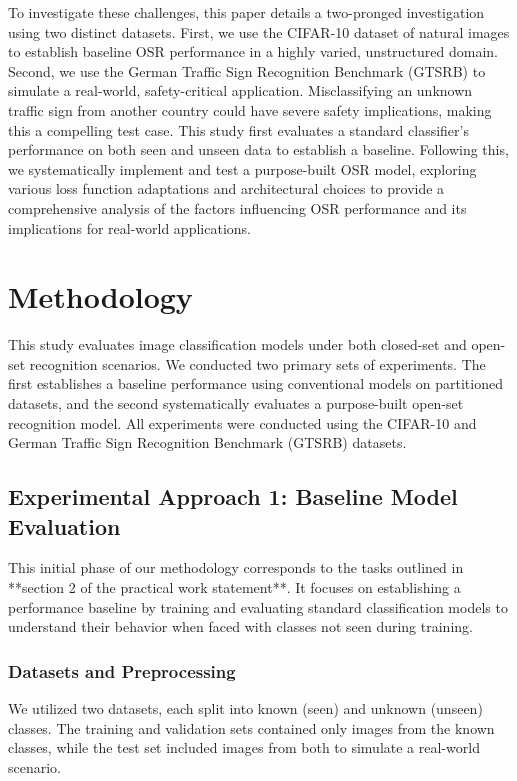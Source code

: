 \documentclass[11pt, a4paper]{article}
\begin{document}
To investigate these challenges, this paper details a two-pronged investigation using two distinct datasets. First, we use the CIFAR-10 dataset of natural images to establish baseline OSR performance in a highly varied, unstructured domain. Second, we use the German Traffic Sign Recognition Benchmark (GTSRB) to simulate a real-world, safety-critical application. Misclassifying an unknown traffic sign from another country could have severe safety implications, making this a compelling test case. This study first evaluates a standard classifier's performance on both seen and unseen data to establish a baseline. Following this, we systematically implement and test a purpose-built OSR model, exploring various loss function adaptations and architectural choices to provide a comprehensive analysis of the factors influencing OSR performance and its implications for real-world applications.

\section{Methodology}

This study evaluates image classification models under both closed-set and open-set recognition scenarios. We conducted two primary sets of experiments. The first establishes a baseline performance using conventional models on partitioned datasets, and the second systematically evaluates a purpose-built open-set recognition model. All experiments were conducted using the CIFAR-10 and German Traffic Sign Recognition Benchmark (GTSRB) datasets.

\subsection{Experimental Approach 1: Baseline Model Evaluation}

This initial phase of our methodology corresponds to the tasks outlined in **section 2 of the practical work statement**. It focuses on establishing a performance baseline by training and evaluating standard classification models to understand their behavior when faced with classes not seen during training.

\subsubsection{Datasets and Preprocessing}
We utilized two datasets, each split into known (seen) and unknown (unseen) classes. The training and validation sets contained only images from the known classes, while the test set included images from both to simulate a real-world scenario.
\end{document}
